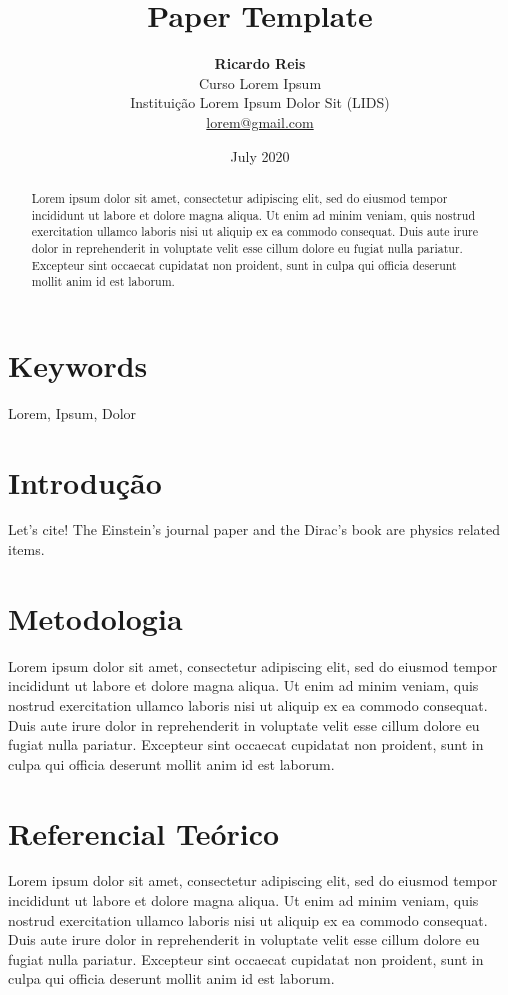 \documentclass[10pt, a4paper,twocolumn]{article}
\title{
    \textbf{Paper Template} %
    }
\author{
    \textbf{Ricardo Reis} \\
    {\small Curso Lorem Ipsum} \\ %
    {\small Instituição Lorem Ipsum Dolor Sit (LIDS)} \\
    {\small \href{mailto:lorem@gmail.com}{lorem@gmail.com }}
    }
\date{July 2020}
\begin{document}
\maketitle

\begin{abstract}
Lorem ipsum dolor sit amet, consectetur adipiscing elit, sed do eiusmod tempor incididunt ut labore et dolore magna aliqua. Ut enim ad minim veniam, quis nostrud exercitation ullamco laboris nisi ut aliquip ex ea commodo consequat. Duis aute irure dolor in reprehenderit in voluptate velit esse cillum dolore eu fugiat nulla pariatur. Excepteur sint occaecat cupidatat non proident, sunt in culpa qui officia deserunt mollit anim id est laborum.
\end{abstract}

\section*{Keywords}
Lorem, Ipsum, Dolor

\section{Introdução}
Let's cite! The Einstein's journal paper \cite{einstein} and the Dirac's 
book \cite{dirac} are physics related items. 

\section{Metodologia}
Lorem ipsum dolor sit amet, consectetur adipiscing elit, sed do eiusmod tempor incididunt ut labore et dolore magna aliqua. Ut enim ad minim veniam, quis nostrud exercitation ullamco laboris nisi ut aliquip ex ea commodo consequat. Duis aute irure dolor in reprehenderit in voluptate velit esse cillum dolore eu fugiat nulla pariatur. Excepteur sint occaecat cupidatat non proident, sunt in culpa qui officia deserunt mollit anim id est laborum.

\section{Referencial Teórico}
Lorem ipsum dolor sit amet, consectetur adipiscing elit, sed do eiusmod tempor incididunt ut labore et dolore magna aliqua. Ut enim ad minim veniam, quis nostrud exercitation ullamco laboris nisi ut aliquip ex ea commodo consequat. Duis aute irure dolor in reprehenderit in voluptate velit esse cillum dolore eu fugiat nulla pariatur. Excepteur sint occaecat cupidatat non proident, sunt in culpa qui officia deserunt mollit anim id est laborum.
\end{document}
